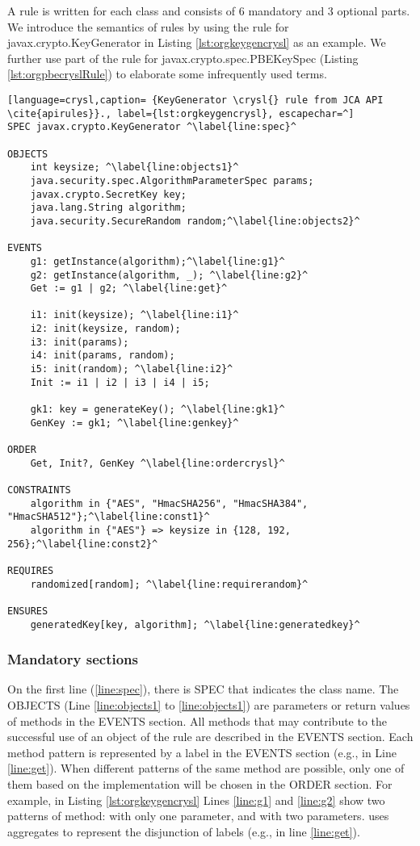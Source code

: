 A \crysl{} rule is written for each class and consists of 6 mandatory and 3 optional parts. We introduce the semantics of \crysl{} rules by using the \crysl{} rule for javax.crypto.KeyGenerator in Listing \ref{lst:orgkeygencrysl} as an example. We further use part of the \crysl{} rule for javax.crypto.spec.PBEKeySpec (Listing \ref{lst:orgpbecryslRule}) to elaborate some infrequently used terms.
\pagebreak
\begin{lstlisting}[language=crysl,caption= {KeyGenerator \crysl{} rule from JCA API \cite{apirules}}., label={lst:orgkeygencrysl}, escapechar=^]
SPEC javax.crypto.KeyGenerator ^\label{line:spec}^

OBJECTS
	int keysize; ^\label{line:objects1}^
	java.security.spec.AlgorithmParameterSpec params;
	javax.crypto.SecretKey key;
	java.lang.String algorithm;
	java.security.SecureRandom random;^\label{line:objects2}^

EVENTS
	g1: getInstance(algorithm);^\label{line:g1}^
	g2: getInstance(algorithm, _); ^\label{line:g2}^
	Get := g1 | g2; ^\label{line:get}^

	i1: init(keysize); ^\label{line:i1}^
	i2: init(keysize, random);
	i3: init(params);
	i4: init(params, random);
	i5: init(random); ^\label{line:i2}^
	Init := i1 | i2 | i3 | i4 | i5;
    
	gk1: key = generateKey(); ^\label{line:gk1}^
	GenKey := gk1; ^\label{line:genkey}^

ORDER
	Get, Init?, GenKey ^\label{line:ordercrysl}^

CONSTRAINTS
	algorithm in {"AES", "HmacSHA256", "HmacSHA384", "HmacSHA512"};^\label{line:const1}^
	algorithm in {"AES"} => keysize in {128, 192, 256};^\label{line:const2}^
   
REQUIRES
	randomized[random]; ^\label{line:requirerandom}^
    
ENSURES 
	generatedKey[key, algorithm]; ^\label{line:generatedkey}^
\end{lstlisting}


\subsubsection{Mandatory sections}
On the first line (\ref{line:spec}), there is SPEC that indicates the class name. The OBJECTS (Line \ref{line:objects1} to \ref{line:objects1}) are parameters or return values of methods in the EVENTS section. All methods that may contribute to the successful use of an object of the \crysl{} rule are described in the EVENTS section. Each method pattern is represented by a label in the EVENTS section (e.g.,  in Line \ref{line:get}). When different patterns of the same method are possible, only one of them based on the implementation will be chosen in the ORDER section. For example, in Listing \ref{lst:orgkeygencrysl} Lines \ref{line:g1} and \ref{line:g2} show two patterns of  method:  with only one parameter, and  with two parameters. \crysl{} uses aggregates to represent the disjunction of labels (e.g.,  in line \ref{line:get}).

